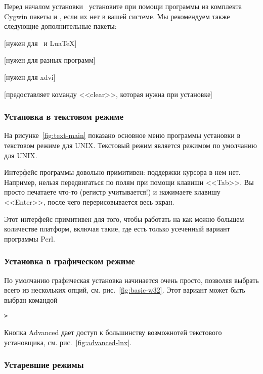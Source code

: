 \documentclass{article}
\begin{document}
Перед началом установки \TL\ установите при помощи программы
 из комплекта Cygwin пакеты  и
, если их нет в вашей системе.  Мы рекомендуем также
следующие дополнительные пакеты: 
\begin{itemize*}
\item {} [нужен для \XeTeX\ и Lua\TeX]
\item {} [нужен для разных программ]
\item {} [нужен для xdvi]
\item {} [предоставляет команду <<clear>>, которая
  нужна при установке]
\end{itemize*}



\subsubsection{Установка в текстовом режиме}

На рисунке~\ref{fig:text-main} показано основное меню программы
установки в текстовом режиме для UNIX.  Текстовый режим является
режимом по умолчанию для UNIX.

Интерфейс программы довольно примитивен:  поддержки курсора в нем
нет.  Например, нельзя передвигаться по полям при помощи клавиши
<<Tab>>.  Вы просто печатаете что-то (регистр учитывается!) и
нажимаете клавишу <<Enter>>, после чего перерисовывается весь экран.

Этот интерфейс примитивен для того, чтобы работать на как можно большем
количестве платформ, включая такие, где есть только усеченный вариант
программы Perl.

\subsubsection{Установка в графическом режиме}
\label{sec:graphical-inst}

По умолчанию графическая установка начинается очень просто, позволяя
выбрать всего из нескольких опций, см. рис.~\ref{fig:basic-w32}. 
Этот вариант может быть выбран командой
\begin{alltt}
> 
\end{alltt}
Кнопка Advanced дает доступ к большинству возможнотей текстового
установщика, см. рис.~\ref{fig:advanced-lnx}.

\subsubsection{Устаревшие режимы}
\end{document}
